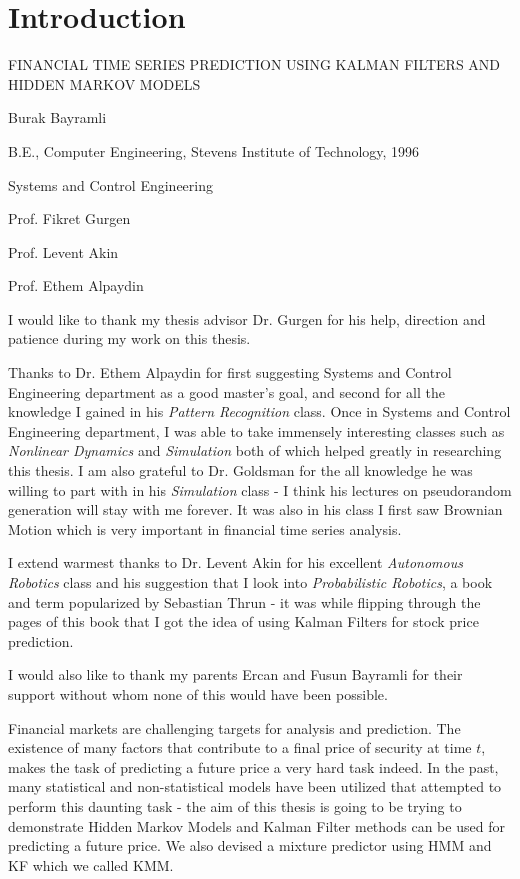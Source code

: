 \chapter{Introduction}

FINANCIAL TIME SERIES PREDICTION USING KALMAN FILTERS AND HIDDEN MARKOV MODELS 

Burak Bayramli

B.E., Computer Engineering, Stevens Institute of Technology, 1996

Systems and Control Engineering

Prof. Fikret Gurgen

Prof. Levent Akin

Prof. Ethem Alpaydin

I would like to thank my thesis advisor Dr. Gurgen for his help, direction and
patience during my work on this thesis. 

Thanks to Dr. Ethem Alpaydin for first suggesting Systems and Control
Engineering department as a good master's goal, and second for all the knowledge
I gained in his {\em Pattern Recognition} class. Once in Systems and Control
Engineering department, I was able to take immensely interesting classes such as
{\em Nonlinear Dynamics} and {\em Simulation} both of which helped greatly in
researching this thesis. I am also grateful to Dr. Goldsman for the all
knowledge he was willing to part with in his {\em Simulation} class - I think
his lectures on pseudorandom generation will stay with me forever. It was also
in his class I first saw Brownian Motion which is very important in financial
time series analysis.

I extend warmest thanks to Dr. Levent Akin for his excellent {\em Autonomous
Robotics} class and his suggestion that I look into {\em Probabilistic
Robotics}, a book and term popularized by Sebastian Thrun - it was while
flipping through the pages of this book that I got the idea of using Kalman
Filters for stock price prediction.

I would also like to thank my parents Ercan and Fusun Bayramli for their support
without whom none of this would have been possible.

\newpage

Financial markets are challenging targets for analysis and prediction. The
existence of many factors that contribute to a final price of security at time
$t$, makes the task of predicting a future price a very hard task indeed. In the
past, many statistical and non-statistical models have been utilized that
attempted to perform this daunting task - the aim of this thesis is going to be
trying to demonstrate Hidden Markov Models and Kalman Filter methods can be used
for predicting a future price. We also devised a mixture predictor using HMM and
KF which we called KMM.

